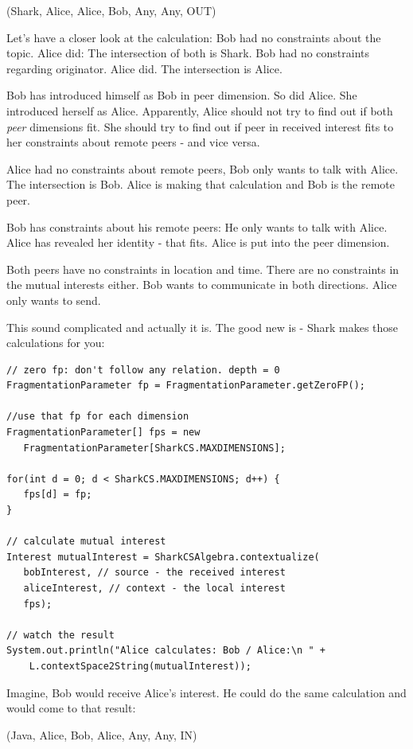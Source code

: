 (Shark, Alice, Alice, Bob, Any, Any, OUT)

Let's have a closer look at the calculation: Bob had no constraints about the topic. Alice did: The intersection of both is Shark. Bob had no constraints regarding originator. Alice did. The intersection is Alice.

Bob has introduced himself as Bob in peer dimension. So did Alice. She introduced herself as Alice. Apparently, Alice should not try to find out if both  {\it peer} dimensions fit. She should try to find out if peer in received interest fits to her constraints about remote peers - and vice versa.

Alice had no constraints about remote peers, Bob only wants to talk with Alice. The intersection is Bob. Alice is making that calculation and Bob is the remote peer.

Bob has constraints about his remote peers: He only wants to talk with Alice. Alice has revealed her identity - that fits. Alice is put into the peer dimension.

Both peers have no constraints in location and time. There are no constraints in the mutual interests either. Bob wants to communicate in both directions. Alice only wants to send.

This sound complicated and actually it is. The good new is - Shark makes those calculations for you:

\begin{verbatim}
// zero fp: don't follow any relation. depth = 0
FragmentationParameter fp = FragmentationParameter.getZeroFP();

//use that fp for each dimension
FragmentationParameter[] fps = new    
   FragmentationParameter[SharkCS.MAXDIMENSIONS];

for(int d = 0; d < SharkCS.MAXDIMENSIONS; d++) {
   fps[d] = fp;
}

// calculate mutual interest
Interest mutualInterest = SharkCSAlgebra.contextualize(
   bobInterest, // source - the received interest
   aliceInterest, // context - the local interest
   fps);

// watch the result
System.out.println("Alice calculates: Bob / Alice:\n " + 
    L.contextSpace2String(mutualInterest));

\end{verbatim}

Imagine, Bob would receive Alice's interest. He could do the same calculation and would come to that result:

(Java, Alice, Bob, Alice, Any, Any, IN)

